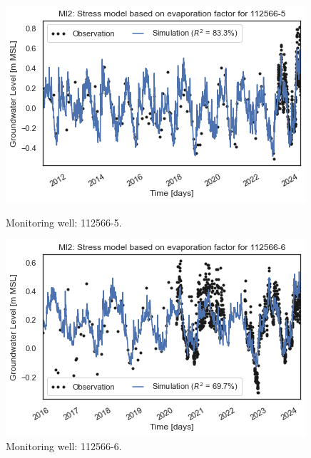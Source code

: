 \begin{figure}[htbp]
    \centering
    \begin{minipage}{0.32\textwidth}
        \centering
        \includegraphics[width=\linewidth]{frontmatter/Rozenburg-fig/1125665.png}
        \caption{Monitoring well: 112566-5.}
        \label{fig:112566-5}
    \end{minipage}
    \hfill
    \begin{minipage}{0.32\textwidth}
        \centering
        \includegraphics[width=\linewidth]{frontmatter/Rozenburg-fig/1125666.png}
        \caption{Monitoring well: 112566-6.}
        \label{fig:112566-6}
    \end{minipage}
    \hfill
    \begin{minipage}{0.32\textwidth}
        \centering

\end{minipage}
\end{figure}
